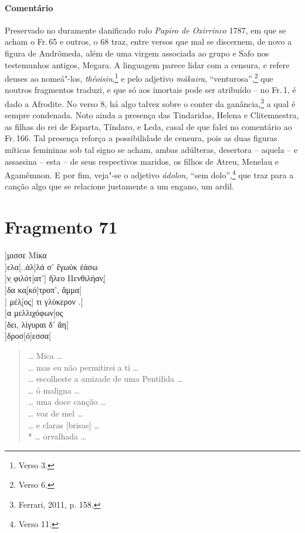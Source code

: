 \pagebreak
{\paragraph{Comentário} Preservado no duramente danificado rolo \textit{Papiro de Oxirrinco} 1787, em que se acham o Fr.\,65 e outros, o 68 traz, entre versos que mal se discernem, de novo a figura de Andrômeda, além de uma virgem associada ao grupo e Safo nos testemunhos antigos, Megara.  A linguagem parece lidar com a censura, e refere deuses ao nomeá"-los, \textit{théoisin},\footnote{Verso 3.} e pelo adjetivo \textit{mákaira}, ``venturosa'',\footnote{Verso 6.} que noutros fragmentos traduzi, e que só aos imortais pode ser atribuído -- no Fr.\,1, é dado a Afrodite. No verso 8, há algo talvez sobre o conter da ganância,\footnote{Ferrari, 2011, p. 158.} a qual é sempre condenada. Noto ainda a presença das Tindaridas, Helena e Clitemnestra, as filhas do rei de Esparta, Tíndaro, e Leda, casal de que falei no comentário ao Fr.\,166. Tal presença reforça a possibilidade de censura, pois as duas figuras míticas femininas sob tal signo se acham, ambas adúlteras, desertora -- aquela -- e assassina -- esta -- de seus respectivos maridos, os filhos de Atreu, Menelau e Agamêmnon. E por fim, veja"-se o adjetivo \textit{ádolon}, ``sem dolo'',\footnote{Verso 11.} que traz para a canção algo que se relacione justamente a um engano, um ardil.}



\pagebreak
\section{Fragmento 71}

\begin{gkverse}
]μισσε Μίκα\\
]ελα[..ἀλ]λά σ’ ἔγωὐκ ἐάσω\\
         ]ν̣ φιλότ[ατ’] ἤλεο Πενθιλήαν̣[\\
]δα κα̣[κό]τροπ’, ἄμμα[\\
    ] μέλ̣[ος] τι γλύκερον .[\\
    ]α μελλιχόφων[ος\\
    ]δει, λίγυραι δ’ ἄη[\\
        ]δροσ[ό]εσσα[
\end{gkverse}

\begin{verse}
\ldots{} Mica \ldots{}\\
\ldots{} mas eu não permitirei a ti \ldots{}\\
\ldots{} escolheste a amizade de uma Pentilida \ldots{}\\
\ldots{} ó maligna \ldots{}\\
\ldots{} uma doce canção \ldots{}\\
\ldots{} voz de mel \ldots{}\\
\ldots{} e claras [brisas] \ldots{}\\*
\ldots{} orvalhada \ldots{}
\end{verse}

